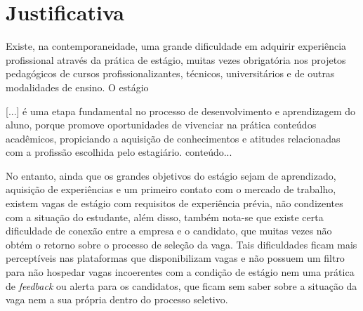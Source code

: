 \section{Justificativa} \label{justificativa}
Existe, na contemporaneidade, uma grande dificuldade em adquirir experiência profissional através da prática de estágio, muitas vezes obrigatória nos projetos pedagógicos de cursos profissionalizantes, técnicos, universitários e de outras modalidades de ensino. O estágio
\begin{quoting}[rightmargin=0cm,leftmargin=4cm]
	\begin{SingleSpace}
		{\footnotesize
		[...] é uma etapa fundamental no processo de desenvolvimento e aprendizagem do aluno, porque promove oportunidades de vivenciar na prática conteúdos acadêmicos, propiciando a aquisição de conhecimentos e atitudes relacionadas com a profissão escolhida pelo estagiário. \cite{ciee}
		}
		conteúdo...
	\end{SingleSpace}
\end{quoting}

No entanto, ainda que os grandes objetivos do estágio sejam de aprendizado, aquisição de experiências e um primeiro contato com o mercado de trabalho, existem vagas de estágio com requisitos de experiência prévia, não condizentes com a situação do estudante, além disso, também nota-se que existe certa dificuldade de conexão entre a empresa e o candidato, que muitas vezes não obtém o retorno sobre o processo de seleção da vaga.
Tais dificuldades ficam mais perceptíveis nas plataformas que disponibilizam vagas e não possuem um filtro para não hospedar vagas incoerentes com a condição de estágio nem uma prática de \textit{feedback} ou alerta para os candidatos, que ficam sem saber sobre a situação da vaga nem a sua própria dentro do processo seletivo.